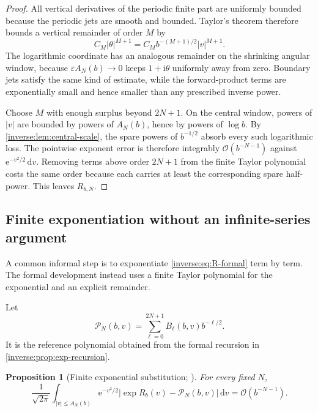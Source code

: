 \documentclass[11pt,oneside]{article}
\newtheorem{proposition}[proposition]{Proposition}
\theoremstyle{definition}
\theoremstyle{remark}
\newcommand{\e}{\mathrm e}
\newcommand{\ii}{\mathrm i}
\newcommand{\dd}{\,\mathrm d}
\newcommand{\bigO}{\mathcal O}
\begin{document}
\begin{proof}
All vertical derivatives of the periodic finite part are uniformly
bounded because the periodic jets are smooth and bounded.  Taylor's
theorem therefore bounds a vertical remainder of order $M$ by
\[
 C_M|\theta|^{M+1}
 =C_M b^{-(M+1)/2}|v|^{M+1}.
\]
The logarithmic coordinate has an analogous remainder on the shrinking
angular window, because $\varepsilon A_N(b)\to0$ keeps
$1+\ii\theta$ uniformly away from zero.  Boundary jets satisfy the same
kind of estimate, while the forward-product terms are exponentially
small and hence smaller than any prescribed inverse power.

Choose $M$ with enough surplus beyond $2N+1$.  On the central window,
powers of $|v|$ are bounded by powers of $A_N(b)$, hence by powers of
$\log b$.  By \cref{inverse:lem:central-scale}, the spare powers of $b^{-1/2}$
absorb every such logarithmic loss.  The pointwise exponent error is
therefore integrably $\bigO(b^{-N-1})$ against
$\e^{-v^2/2}\dd v$.  Removing terms above order $2N+1$ from the finite
Taylor polynomial costs the same order because each carries at least the
corresponding spare half-power.  This leaves $R_{b,N}$.
\end{proof}

\subsection{Finite exponentiation without an infinite-series argument}

A common informal step is to exponentiate \eqref{inverse:eq:R-formal} term by
term.  The formal development instead uses a finite Taylor polynomial for
the exponential and an explicit remainder.

Let
\[
 \mathcal P_N(b,v)
 =\sum_{\ell=0}^{2N+1}B_\ell(b,v)b^{-\ell/2}.
 \label{inverse:eq:reference-polynomial}
\]
It is the reference polynomial obtained from the formal recursion in
\cref{inverse:prop:exp-recursion}.

\begin{proposition}[Finite exponential substitution; \Formalized]
\label{inverse:prop:finite-exp-substitution}
For every fixed $N$,
\begin{equation}
 \frac1{\sqrt{2\pi}}
 \int_{|v|\leq A_N(b)}
 \e^{-v^2/2}
 \left|\exp R_b(v)-\mathcal P_N(b,v)\right|\dd v
 =\bigO(b^{-N-1}). \label{inverse:eq:central-reference-error}
\end{equation}
\end{proposition}
\end{document}
